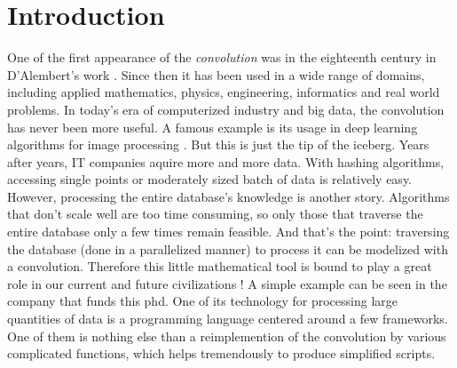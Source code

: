 \chapter*{Introduction}\label{chp:int}

One of the first appearance of the \emph{convolution} was in the eighteenth century in D'Alembert's work \citep{wiki:enc}. Since then it has been used in a wide range of domains, including applied mathematics, physics, engineering, informatics and real world problems. In today's era of computerized industry and big data, the convolution has never been more useful. A famous example is its usage in deep learning algorithms for image processing \citep{lecun2015deep}. But this is just the tip of the iceberg. Years after years, IT companies aquire more and more data. With hashing algorithms, accessing single points or moderately sized batch of data is relatively easy. However, processing the entire database's knowledge is another story. Algorithms that don't scale well are too time consuming, so only those that traverse the entire database only a few times remain feasible. And that's the point: traversing the database (done in a parallelized manner) to process it can be modelized with a convolution. Therefore this little mathematical tool is bound to play a great role in our current and future civilizations ! %
A simple example can be seen in the company that funds this phd. One of its technology for processing large quantities of data is a programming language centered around a few frameworks. One of them %
is nothing else than a reimplemention of the convolution by various complicated functions, which helps tremendously to produce simplified scripts.


